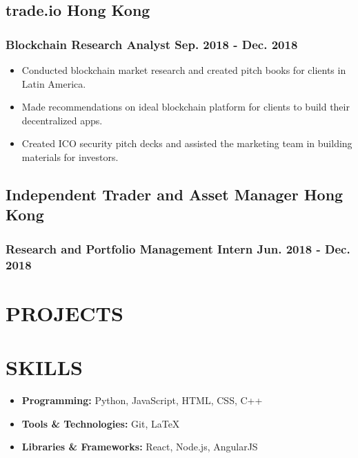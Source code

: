\documentclass{article}
\begin{document}
\vspace{-1.6mm}

\subsection{trade.io \hspace{5.85in} Hong Kong}
\subsubsection{Blockchain Research Analyst \hspace{4.3in} Sep. 2018 - Dec. 2018}
\vspace{-2.9mm}
\begin{itemize}[noitemsep]
\item Conducted blockchain market research and created pitch books for clients in Latin America.
\item Made recommendations on ideal blockchain platform for clients to build their decentralized apps.
\item Created ICO security pitch decks and assisted the marketing team in building materials for investors.
\end{itemize}

\vspace{-1.6mm}

\subsection{Independent Trader and Asset Manager \hspace{3.3in} Hong Kong}
\subsubsection{Research and Portfolio Management Intern \hspace{3.5in} Jun. 2018 - Dec. 2018}




\vspace{-1.6mm}
\section{PROJECTS}


\section{SKILLS}
\vspace{-2mm}
\begin{itemize}[noitemsep]
\item \textbf{Programming:} Python, JavaScript, HTML, CSS, C++
\item \textbf{Tools \& Technologies:} Git, {\LaTeX}
\item \textbf{Libraries \& Frameworks:} React, Node.js, AngularJS
\end{itemize}
\end{document}
